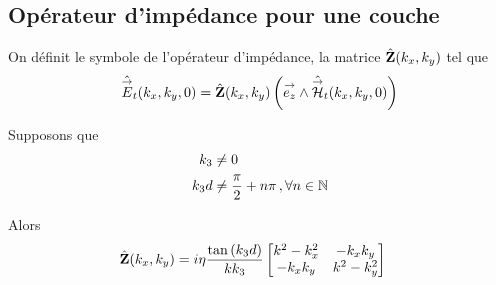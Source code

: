     \subsection{Opérateur d'impédance pour une couche}

        \begin{defn}
            On définit le symbole de l'opérateur d'impédance, la matrice \(\hat {\mathbf{Z}}(k_x,k_y)\) tel que
            \begin{equation}
                \hat {{\overset{\rightarrow}{E}}}_t(k_x,k_y,0) = \hat {\mathbf{Z}}(k_x,k_y) \left({\overset{\rightarrow}{e_z}} \wedge \hat {{\overset{\rightarrow}{\mathcal{H}}}}_t(k_x,k_y,0)\right)
            \end{equation}
        \end{defn}

        \begin{thm}
            Supposons que
            \begin{subequations}
                \label{eq:imp_fourier:plan:hyp_1_c}
                \begin{align}
                    k_3     & \not =0 \\
                    k_3d    & \not = \dfrac{\pi}{2}+n\pi\,, \forall n \in \mathbb N
                \end{align}
            \end{subequations}

            Alors
            \begin{align}
            \label{eq:imp_plan:symb_z:1c}
            \hat {\mathbf{Z}}(k_x,k_y) &= i\eta\dfrac{\tan\left(k_3d\right)}{kk_3}
                \begin{bmatrix}
                   k^2-k_x^2  & -k_xk_y\\
                    -k_xk_y & k^2-k_y^2\\
                \end{bmatrix}
            \end{align}
        \end{thm}

